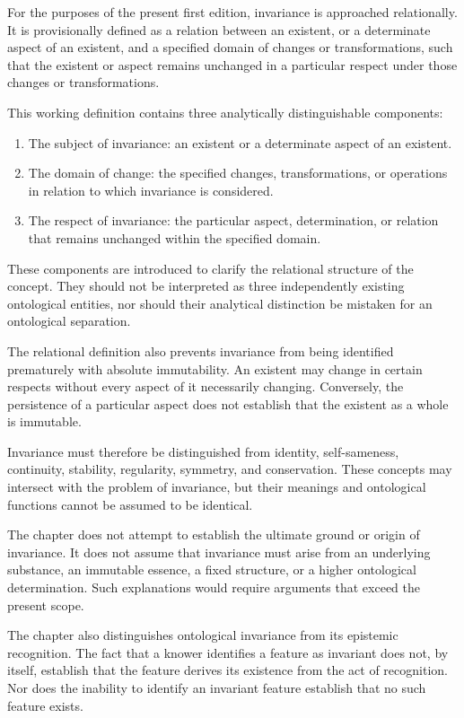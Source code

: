 For the purposes of the present first edition, invariance is
approached relationally. It is provisionally defined as a
relation between an existent, or a determinate aspect of an
existent, and a specified domain of changes or transformations,
such that the existent or aspect remains unchanged in a
particular respect under those changes or transformations.

This working definition contains three analytically distinguishable
components:

\begin{enumerate}
    \item The subject of invariance: an existent or a determinate
    aspect of an existent.

    \item The domain of change: the specified changes,
    transformations, or operations in relation to which
    invariance is considered.

    \item The respect of invariance: the particular aspect,
    determination, or relation that remains unchanged within
    the specified domain.
\end{enumerate}

These components are introduced to clarify the relational
structure of the concept. They should not be interpreted as
three independently existing ontological entities, nor should
their analytical distinction be mistaken for an ontological
separation.

The relational definition also prevents invariance from being
identified prematurely with absolute immutability. An existent
may change in certain respects without every aspect of it
necessarily changing. Conversely, the persistence of a
particular aspect does not establish that the existent as a
whole is immutable.

Invariance must therefore be distinguished from identity,
self-sameness, continuity, stability, regularity, symmetry,
and conservation. These concepts may intersect with the
problem of invariance, but their meanings and ontological
functions cannot be assumed to be identical.

The chapter does not attempt to establish the ultimate ground
or origin of invariance. It does not assume that invariance
must arise from an underlying substance, an immutable essence,
a fixed structure, or a higher ontological determination.
Such explanations would require arguments that exceed the
present scope.

The chapter also distinguishes ontological invariance from
its epistemic recognition. The fact that a knower identifies
a feature as invariant does not, by itself, establish that
the feature derives its existence from the act of recognition.
Nor does the inability to identify an invariant feature
establish that no such feature exists.


